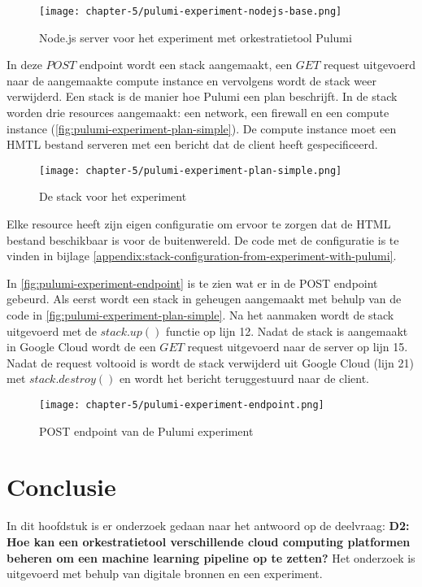 \begin{figure}[hbt!]
  \centering
  \texttt{[image: chapter-5/pulumi-experiment-nodejs-base.png]}
  \caption{Node.js server voor het experiment met orkestratietool Pulumi}
  \label{fig:pulumi-experiment-nodejs-base}
\end{figure}

In deze \(POST\) endpoint wordt een stack aangemaakt, een \(GET\) request uitgevoerd naar de aangemaakte compute instance en vervolgens wordt de stack weer verwijderd. Een stack is de manier hoe Pulumi een plan beschrijft. In de stack worden drie resources aangemaakt: een network, een firewall en een compute instance (\autoref{fig:pulumi-experiment-plan-simple}). De compute instance moet een HMTL bestand serveren met een bericht dat de client heeft gespecificeerd. 

\begin{figure}[hbt!]
  \centering
  \texttt{[image: chapter-5/pulumi-experiment-plan-simple.png]}
  \caption{De stack voor het experiment}
  \label{fig:pulumi-experiment-plan-simple}
\end{figure}

Elke resource heeft zijn eigen configuratie om ervoor te zorgen dat de HTML bestand beschikbaar is voor de buitenwereld. De code met de configuratie is te vinden in bijlage \ref{appendix:stack-configuration-from-experiment-with-pulumi}.

In \autoref{fig:pulumi-experiment-endpoint} is te zien wat er in de POST endpoint gebeurd. Als eerst wordt een stack in geheugen aangemaakt met behulp van de code in \autoref{fig:pulumi-experiment-plan-simple}. Na het aanmaken wordt de stack uitgevoerd met de \(stack.up()\) functie op lijn 12. Nadat de stack is aangemaakt in Google Cloud wordt de een \(GET\) request uitgevoerd naar de server op lijn 15. Nadat de request voltooid is wordt de stack verwijderd uit Google Cloud (lijn 21) met \(stack.destroy()\) en wordt het bericht teruggestuurd naar de client.

\begin{figure}[hbt!]
  \centering
  \texttt{[image: chapter-5/pulumi-experiment-endpoint.png]}
  \caption{POST endpoint van de Pulumi experiment}
  \label{fig:pulumi-experiment-endpoint}
\end{figure}

\section{Conclusie}\label{subsec:ch5-conclusie}
In dit hoofdstuk is er onderzoek gedaan naar het antwoord op de deelvraag: \textbf{D2: Hoe kan een orkestratietool verschillende cloud computing platformen beheren om een machine learning pipeline op te zetten?} Het onderzoek is uitgevoerd met behulp van digitale bronnen en een experiment.

